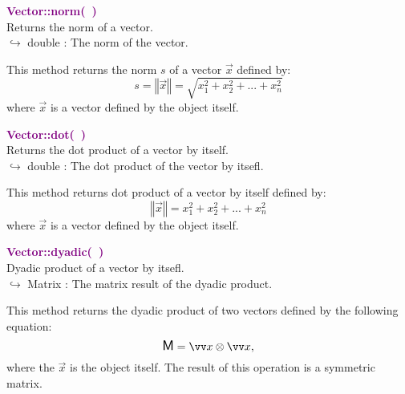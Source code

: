 \textcolor{purple}{\textbf{Vector::norm(~)}}\label{Vector::norm()}\\
Returns the norm of a vector.\\ \hspace*{10mm}$\hookrightarrow$ double : The norm of the vector.

This method returns the norm $s$ of a vector $\overrightarrow{x}$ defined by:
\begin{equation*}
s = \left\Vert \overrightarrow{x} \right\Vert = \sqrt {x_{1}^2 + x_{2}^2 + ... + x_{n}^2}
\end{equation*}
where $\overrightarrow{x}$ is a vector defined by the object itself.

\textcolor{purple}{\textbf{Vector::dot(~)}}\label{Vector::dot()}\\
Returns the dot product of a vector by itself.\\ \hspace*{10mm}$\hookrightarrow$ double : The dot product of the vector by itsefl.

This method returns dot product of a vector by itself defined by:
\begin{equation*}
 \left\Vert \overrightarrow{x} \right\Vert  = x_{1}^2 + x_{2}^2 + ... + x_{n}^2
\end{equation*}
where $\overrightarrow{x}$ is a vector defined by the object itself.

\textcolor{purple}{\textbf{Vector::dyadic(~)}}\label{Vector::dyadic()}\\
Dyadic product of a vector by itsefl.\\ \hspace*{10mm}$\hookrightarrow$ Matrix : The matrix result of the dyadic product.

This method returns the dyadic product of two vectors defined by the following equation:
\begin{equation*}
\M = \overrightarrow{x}\otimes\overrightarrow{x},
\end{equation*}
where the $\overrightarrow{x}$ is the object itself.
The result of this operation is a symmetric matrix.

